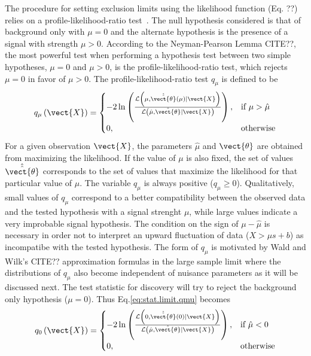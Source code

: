 The procedure for setting exclusion limits using the likelihood function (Eq. ??)
relies on a profile-likelihood-ratio test~\cite{Cowan:2010js}.
The null hypothesis considered is that of background only with $\mu=0$ and the alternate hypothesis 
is the presence of a signal with strength $\mu>0$.
According to the Neyman-Pearson Lemma CITE??, 
the most powerful test when performing a hypothesis test between two simple hypotheses, $\mu=0$ and $\mu>0$,
is the profile-likelihood-ratio test, which rejects $\mu=0$ in favor of $\mu>0$.
The profile-likelihood-ratio test $q_{\mu}$ is defined to be
\begin{equation}
q_{\mu}  \left( \vect{X} \right)= 
\begin{cases}
  -2\ln\left(
  \frac
      {\mathcal{L} \left( \mu, \hat{\hat{\vect{\theta}}}\left(\mu\right) \rvert \vect{X} \right)}
      {\mathcal{L} \left( \hat{\mu}, \hat{\vect{\theta}} \rvert \vect{X} \right)}
 \right), & \text{if}\ \mu > \hat{\mu} \\
      0, & \text{otherwise}
    \end{cases}
\label{eq:stat.limit.qmu}
\end{equation}
For a given observation $\vect{X}$, the parameters $\hat{\mu}$ and $\vect{\theta}$ are obtained from maximizing the likelihood. 
If the value of $\mu$ is also fixed, the set of values $\hat{\hat{\vect{\theta}}}$ corresponds to the set of values that 
maximize the likelihood for that particular value of $\mu$. The variable $q_{\mu}$ is always positive ($q_{\mu}\geq0$).
Qualitatively, small values of $q_{\mu}$ correspond to a better compatibility between the observed data and the 
tested hypothesis with a signal strenght $\mu$, while large values indicate a very improbable signal hypothesis.
The condition on the sign of $ \mu - \hat{\mu}$ is necessary in order not to interpret an upward fluctuation of data 
($X > \mu s + b$) as incompatibe with the tested hypothesis. 
The form of $q_{\mu}$ is motivated by Wald and Wilk's CITE?? approximation formulas in the large sample limit
where the distributions of $q_{\mu}$ also become independent of nuisance parameters as it will be discussed next.
The test statistic for discovery will try to reject the background only hypothesis ($\mu=0$). Thus Eq.\ref{eq:stat.limit.qmu} becomes
\begin{equation}
q_{0}  \left( \vect{X} \right)= 
\begin{cases}
  -2\ln\left(
  \frac
      {\mathcal{L} \left( 0, \hat{\hat{\vect{\theta}}}\left(0\right) \rvert \vect{X} \right)}
      {\mathcal{L} \left( \hat{\mu}, \hat{\vect{\theta}} \rvert \vect{X} \right)}
 \right), & \text{if}\ \hat{\mu} < 0 \\
      0, & \text{otherwise}
    \end{cases}
\end{equation}


